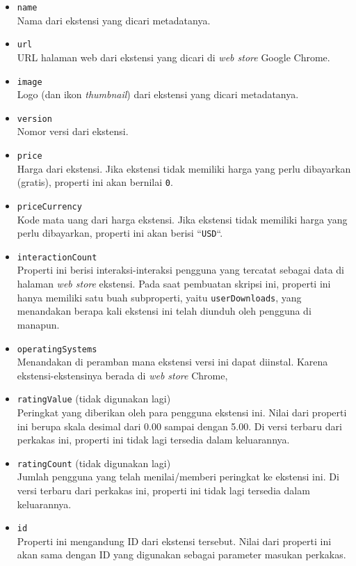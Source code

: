 \begin{itemize}
	\item \verb|name|\\
	Nama dari ekstensi yang dicari metadatanya.
	\item \verb|url|\\
	URL halaman web dari ekstensi yang dicari di \textit{web store} Google Chrome.
	\item \verb|image|\\
	Logo (dan ikon \textit{thumbnail}) dari ekstensi yang dicari metadatanya.
	\item \verb|version|\\
	Nomor versi dari ekstensi.
	\item \verb|price|\\
	Harga dari ekstensi. Jika ekstensi tidak memiliki harga yang perlu dibayarkan (gratis), properti ini akan bernilai \verb|0|.
	\item \verb|priceCurrency|\\
	Kode mata uang dari harga ekstensi. Jika ekstensi tidak memiliki harga yang perlu dibayarkan, properti ini akan berisi ``\verb|USD|``.
	\item \verb|interactionCount|\\
	Properti ini berisi interaksi-interaksi pengguna yang tercatat sebagai data di halaman \textit{web store} ekstensi. Pada saat pembuatan skripsi ini, properti ini hanya memiliki satu buah subproperti, yaitu \verb|userDownloads|, yang menandakan berapa kali ekstensi ini telah diunduh oleh pengguna di manapun.
	\item \verb|operatingSystems|\\
	Menandakan di peramban mana ekstensi versi ini dapat diinstal. Karena ekstensi-ekstensinya berada di \textit{web store} Chrome,
	\item \verb|ratingValue| (tidak digunakan lagi)\\
	Peringkat yang diberikan oleh para pengguna ekstensi ini. Nilai dari properti ini berupa skala desimal dari 0.00 sampai dengan 5.00. Di versi terbaru dari perkakas ini, properti ini tidak lagi tersedia dalam keluarannya.
	\item \verb|ratingCount| (tidak digunakan lagi)\\
	Jumlah pengguna yang telah menilai/memberi peringkat ke ekstensi ini. Di versi terbaru dari perkakas ini, properti ini tidak lagi tersedia dalam keluarannya.
	\item \verb|id|\\
	Properti ini mengandung ID dari ekstensi tersebut. Nilai dari properti ini akan sama dengan ID yang digunakan sebagai parameter masukan perkakas.
\end{itemize}
\vfill
